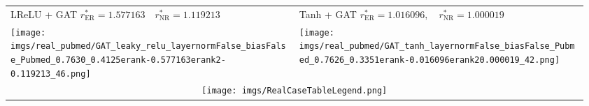 \begin{tabular}{p{0.48\linewidth}|p{0.48\linewidth}}
        \midrule
        \makecell[c]{LReLU + GAT \\ $r^*_\mathrm{ER}=1.577163 \quad r^*_\mathrm{NR}=1.119213$} & \makecell[c]{Tanh + GAT \\ $r^*_\mathrm{ER}=1.016096, \quad r^*_\mathrm{NR}=1.000019$}\\
        \hspace{30pt}\texttt{[image: imgs/real\_pubmed/GAT\_leaky\_relu\_layernormFalse\_biasFalse\_Pubmed\_0.7630\_0.4125erank-0.577163erank2-0.119213\_46.png]} & \hspace{30pt}\texttt{[image: imgs/real\_pubmed/GAT\_tanh\_layernormFalse\_biasFalse\_Pubmed\_0.7626\_0.3351erank-0.016096erank20.000019\_42.png]}\\
        \midrule
        \multicolumn{2}{c}{\texttt{[image: imgs/RealCaseTableLegend.png]}} \\
        \bottomrule
    \end{tabular}